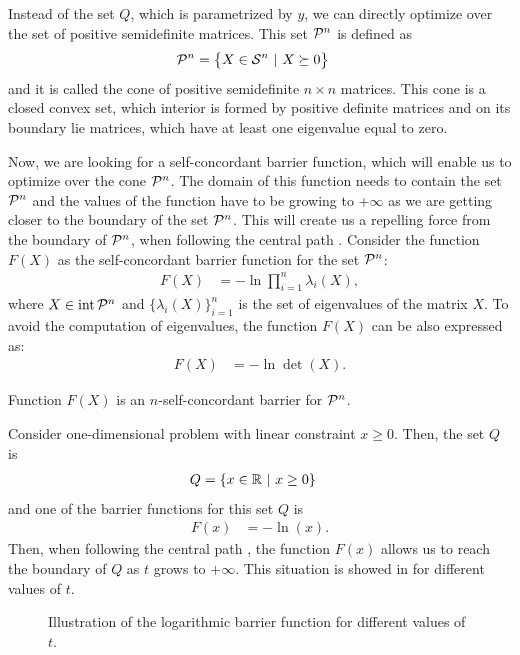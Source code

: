 Instead of the set $Q$, which is parametrized by $y$, we can directly optimize over the set of positive semidefinite matrices. This set $\mathcal{P}^n$ is defined as
\begin{align}
  \mathcal{P}^n &= \big\{X\in\mathcal{S}^n\ |\ X\succeq0\big\}
\end{align}
and it is called the cone of positive semidefinite $n\times n$ matrices. This cone is a closed convex set, which interior is formed by positive definite matrices and on its boundary lie matrices, which have at least one eigenvalue equal to zero.

Now, we are looking for a self-concordant barrier function, which will enable us to optimize over the cone $\mathcal{P}^n$.
The domain of this function needs to contain the set $\mathcal{P}^n$ and the values of the function have to be growing to $+\infty$ as we are getting closer to the boundary of the set $\mathcal{P}^n$.
This will create us a repelling force from the boundary of $\mathcal{P}^n$, when following the central path .
Consider the function $F(X)$ as the self-concordant barrier function for the set $\mathcal{P}^n$:
\begin{align}
  F(X) &= -\ln\prod_{i=1}^{n}\lambda_i(X),
\end{align}
where $X\in\operatorname{int}\mathcal{P}^n$ and $\big\{\lambda_i(X)\big\}_{i=1}^n$ is the set of eigenvalues of the matrix $X$.
To avoid the computation of eigenvalues, the function $F(X)$ can be also expressed as:
\begin{align}
  F(X) &= -\ln\det(X).
\end{align}

\begin{theorem}
  Function $F(X)$ is an $n$-self-concordant barrier for $\mathcal{P}^n$.
\end{theorem}

\begin{example}
  Consider one-dimensional problem with linear constraint $x \geq 0$.
  Then, the set $Q$ is
  \begin{align}
    Q &= \{x\in\mathbb{R}\ |\ x \geq 0\}
  \end{align}
  and one of the barrier functions for this set $Q$ is
  \begin{align}
    F(x) &= -\ln(x).
  \end{align}
  Then, when following the central path , the function $F(x)$ allows us to reach the boundary of $Q$ as $t$ grows to $+\infty$.
  This situation is showed in  for different values of $t$.

  \begin{figure}[ht]
    \centering
    \resizebox{0.95\textwidth}{!}{}
    \caption{Illustration of the logarithmic barrier function for different values of $t$.}
  \end{figure}
\end{example}

